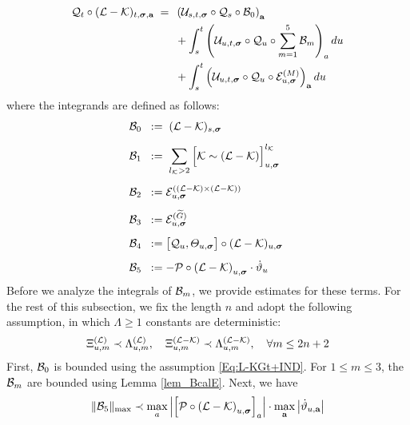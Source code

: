         
\begin{align}\label{int_K-L+Q2}
  {\cal Q}_t\circ   (\mathcal{L} - \mathcal{K})_{t, \boldsymbol{\sigma}, \textbf{a}} \;=\; \; &
    \left(\mathcal{U}_{s, t, \boldsymbol{\sigma}} \circ  {\cal Q}_s\circ {\cal B}_0\right)_{\textbf{a}} \\\nonumber
    &+   \int_{s}^t \left(\mathcal{U}_{u, t, \boldsymbol{\sigma}} \circ  {\cal Q}_u\circ  \sum_{m=1}^5{\cal B}_m  \right)_a du
   \\\nonumber
    &+  \int_{s}^t \left(\mathcal{U}_{u, t, \boldsymbol{\sigma}} \circ  {\cal Q}_u\circ \mathcal{E}^{(M)}_{u, \boldsymbol{\sigma}}\right)_{\textbf{a}} du
\end{align}
where the integrands are defined as follows:
\begin{align}
{\cal B}_0\;&\;:=\;(\mathcal{L} - \mathcal{K})_{s, \boldsymbol{\sigma}}
   \\[5pt]\nonumber {\cal B}_1\;&\;:=\;\sum_{l_\mathcal{K}>2}\Big[\mathcal{K} \sim (\mathcal{L} - \mathcal{K})\Big]^{l_\mathcal{K}}_{u, \boldsymbol{\sigma}}\\[5pt]\nonumber
    {\cal B}_2\;&\;:=\mathcal{E}^{((\mathcal{L} - \mathcal{K}) \times (\mathcal{L} - \mathcal{K}))}_{u, \boldsymbol{\sigma}}\;\\[5pt]\nonumber
    {\cal B}_3\;&\;:=\mathcal{E}^{(\widetilde{G})}_{u, \boldsymbol{\sigma}}\;\\[5pt]\nonumber
    {\cal B}_4\;&\;:= \big[{\cal Q}_u , \varTheta_{u,\boldsymbol{\sigma}} \big]\circ (\mathcal{L} - \mathcal{K}) _{u, \boldsymbol{\sigma} }\;\\[5pt]\nonumber
    {\cal B}_5\;&\;:= -{\cal P} \circ
      \left(\mathcal{L} - \mathcal{K}\right)_{u, \boldsymbol{\sigma}}
        \cdot \dot \vartheta_{u } \; 
\end{align}
Before we analyze the integrals of ${\cal B}_{m}$, we provide estimates for these terms. For the rest of this subsection, we fix the length $n$ and adopt the following assumption, in which $\Lambda\geq1$ constants are deterministic:
 \begin{align}
  \Xi^{({\cal L})}_{u, { m }}\prec \Lambda^{({\cal L})}_{u, { m }},\quad  \Xi^{({\cal L-\cal K})}_{u, { m}}\prec \Lambda^{({\cal L-\cal K})}_{u, {m}},\quad \forall m\le 2n+2 \label{STOeq_Qt_assume_0}
 \end{align}
First, ${\cal B}_0$ is bounded using the assumption \eqref{Eq:L-KGt+IND}. For $1\le m\le 3$, the ${\cal B}_{m}$ are bounded using Lemma  \ref{lem_BcalE}. Next, we have
\begin{align}\label{jfasiuu}
\|{\cal B}_5\|_{\max}  \prec 
          \max_{a} \left|\left[{\cal P} \circ
      \left(\mathcal{L} - \mathcal{K}\right)_{u, \boldsymbol{\sigma}}\right]_a\right| \cdot   \max_{\textbf{a}} \left| 
          \dot \vartheta_{u,\textbf{a} } \right|
\end{align}  
